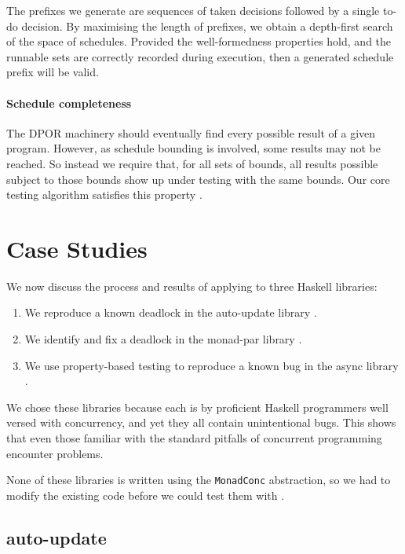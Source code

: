 The prefixes we generate are sequences of taken decisions followed by
a single to-do decision.  By maximising the length of prefixes, we
obtain a depth-first search of the space of schedules.  Provided the
well-formedness properties hold, and the runnable sets are correctly
recorded during execution, then a generated schedule prefix will be
valid.

\paragraph{Schedule completeness}
The DPOR machinery should eventually find every possible result of a
given program.  However, as schedule bounding is involved, some
results may not be reached.  So instead we require that, for all sets
of bounds, all results possible subject to those bounds show up under
testing with the same bounds.  Our core testing algorithm satisfies
this property \parencite{coons2013}.

\section{Case Studies}
\label{sec:dejafu-casestudies}

We now discuss the process and results of applying \dejafu{} to three
Haskell libraries:

\begin{enumerate}
\item We reproduce a known deadlock in the auto-update
  library \parencite{auto_update}.
\item We identify and fix a deadlock in the monad-par
  library \parencite{monad_par,marlow2011}.
\item We use property-based testing to reproduce a known bug in the
  async library \parencite{async}.
\end{enumerate}

We chose these libraries because each is by proficient Haskell
programmers well versed with concurrency, and yet they all contain
unintentional bugs.  This shows that even those familiar with the
standard pitfalls of concurrent programming encounter problems.

None of these libraries is written using the \verb|MonadConc|
abstraction, so we had to modify the existing code before we could
test them with \dejafu{}.

\subsection{auto-update}

